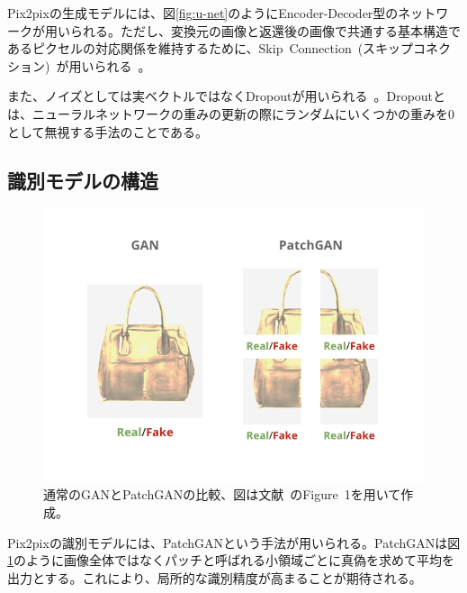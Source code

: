 Pix2pixの生成モデルには、図\ref{fig:u-net}のようにEncoder-Decoder型のネットワークが用いられる。ただし、変換元の画像と返還後の画像で共通する基本構造であるピクセルの対応関係を維持するために、Skip~Connection~(スキップコネクション)~が用いられる~\cite{u-net}。


また、ノイズとしては実ベクトルではなくDropoutが用いられる~\cite{Dropout}。Dropoutとは、ニューラルネットワークの重みの更新の際にランダムにいくつかの重みを0として無視する手法のことである。

\subsection{識別モデルの構造}

\begin{figure}[t]
\begin{center}
\includegraphics[width=0.95\hsize]{figure/patchgan.png}
\caption{通常のGANとPatchGANの比較、図は文献~\cite{pix2pix}のFigure~1を用いて作成。}
\label{fig:patchgan}
\end{center}
\end{figure}

Pix2pixの識別モデルには、PatchGANという手法が用いられる。PatchGANは図\ref{fig:patchgan}のように画像全体ではなくパッチと呼ばれる小領域ごとに真偽を求めて平均を出力とする。これにより、局所的な識別精度が高まることが期待される。